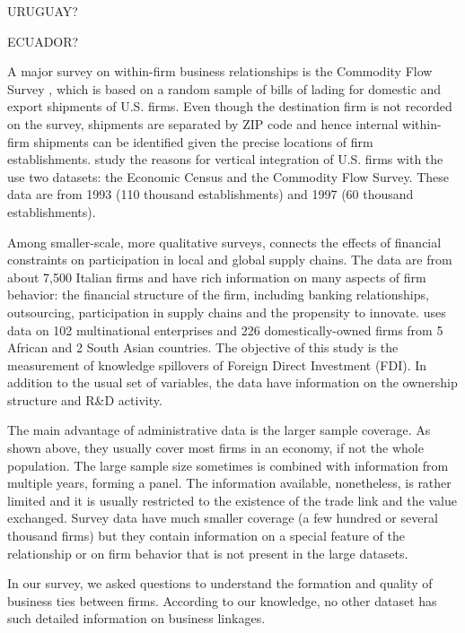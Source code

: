 \documentclass[final, dvipsnames, authoryear,12pt]{elsarticle}
\begin{document}
URUGUAY?

ECUADOR?

A major survey on within-firm business relationships is the Commodity Flow Survey \cite{CFS}, which is based on a random sample of bills of lading for domestic and export shipments of U.S. firms. Even though the destination firm is not recorded on the survey, shipments are separated by ZIP code and hence internal within-firm shipments can be identified given the precise locations of firm establishments. \cite{atalay2014vertical} study the reasons for vertical integration of U.S. firms with the use two datasets: the Economic Census and the Commodity Flow Survey. These data are from 1993 (110 thousand establishments) and 1997 (60 thousand establishments). 

Among smaller-scale, more qualitative surveys, \cite{minetti2018financial} connects the effects of financial constraints on participation in local and global supply chains. The data are from about 7,500 Italian firms and have rich information on many aspects of firm behavior: the financial structure of the firm, including banking relationships, outsourcing, participation in supply chains and the propensity to innovate. \cite{newman2018linked}  uses data on 102 multinational enterprises and 226 domestically-owned firms from 5 African and 2 South Asian countries. The objective of this study is the measurement of knowledge spillovers of Foreign Direct Investment (FDI). In addition to the usual set of variables, the data have information on the ownership structure and R\&D activity.

The main advantage of administrative data is the larger sample coverage. As shown above, they usually cover most firms in an economy, if not the whole population. The large sample size sometimes is combined with information from multiple years, forming a panel. The information available, nonetheless, is rather limited and it is usually restricted to the existence of the trade link and the value exchanged. Survey data have much smaller coverage (a few hundred or several thousand firms) but they contain information on a special feature of the relationship or on firm behavior that is not present in the large datasets.

In our survey, we asked questions to understand the formation and quality of business ties between firms. According to our knowledge, no other dataset has such detailed information on business linkages. 

\end{document}
